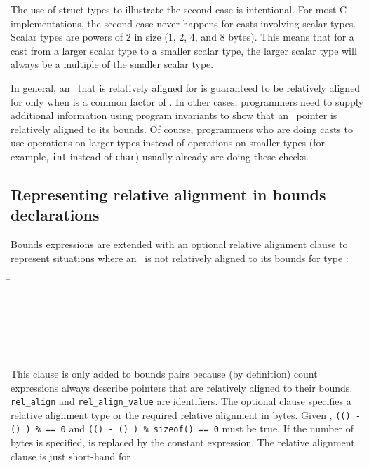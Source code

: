 The use of struct types to illustrate the second case is intentional.
For most C implementations, the second case never happens for casts
involving scalar types. Scalar types are powers of 2 in size (1, 2, 4,
and 8 bytes). This means that for a cast from a larger scalar type to a
smaller scalar type, the larger scalar type will always be a multiple of
the smaller scalar type.

In general, an
\arrayptrT\ that is
relatively aligned for  is guaranteed to be relatively aligned
for  only
when  is a common factor of
. In other cases, programmers need to
supply additional information using program invariants to show that an
\arrayptr\ pointer is relatively aligned to its bounds. Of
course, programmers who are doing casts to use operations on larger
types instead of operations on smaller types (for example, \texttt{int}
instead of \texttt{char}) usually already are doing these checks.

\subsection{Representing relative alignment in bounds declarations}
\label{section:representing-relative-alignment}

Bounds expressions are extended with an optional relative alignment 
clause to represent situations where an \arrayptrT\ is not relatively 
aligned to its bounds for type :

\begin{tabbing}
\=\\
\> \var{\ldots{}}\\
\> 
          \\
\\
\\
\>  \\
\>  
\end{tabbing}

This clause is only added to bounds pairs because (by definition) count
expressions always describe pointers that are relatively aligned to
their bounds.  \texttt{rel\_align} and \texttt{rel\_align\_value} are
identifiers.  The optional clause specifies a
relative alignment type  or the required relative alignment in
bytes.  Given
,
\texttt{((\arrayptrchar)  - (\arrayptrchar) ) \%
         == 0} and
\texttt{((\arrayptrchar)  - (\arrayptrchar) ) \%
sizeof() == 0} must be true. If the number of bytes is
specified,  is replaced by the
constant expression.  The relative alignment clause 
is just short-hand for .

